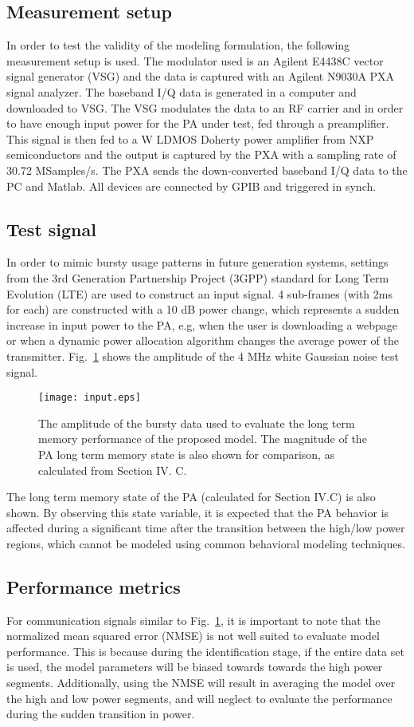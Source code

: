 \documentclass[journal]{IEEEtran}
\begin{document}
\subsection{Measurement setup}
In order to test the validity of the modeling formulation, the following measurement setup is used. The modulator used
is an Agilent E4438C vector signal generator (VSG) and the data is captured with an Agilent N9030A PXA signal analyzer. The baseband I/Q data is generated in a computer and
downloaded to VSG. The VSG modulates the data to an RF carrier and
in order to have enough input power for the PA under test, fed
through a preamplifier. This signal is then fed to a  W LDMOS Doherty power amplifier from NXP semiconductors and the output is captured by the PXA with a sampling rate of 30.72 MSamples/s. The
PXA sends the down-converted baseband I/Q data to the PC and Matlab. All devices are connected by
GPIB and triggered in synch.

\subsection{Test signal}
In order to mimic bursty usage patterns in future generation systems, settings from the 3rd Generation Partnership Project (3GPP) standard for Long Term Evolution (LTE) \cite{lte} are used to construct an input signal. 4 sub-frames (with 2ms for each) are constructed with a 10 dB power change, which represents a sudden increase in input power to the PA, e.g, when the user is downloading a webpage or when a dynamic power allocation algorithm changes the average power of the transmitter. Fig.~\ref{input} shows the amplitude of the 4 MHz white Gaussian noise test signal.
\begin{figure}
\centering
\texttt{[image: input.eps]}
\caption{The amplitude of the bursty data used to evaluate the long term memory performance of the proposed model. The magnitude of the PA long term memory state is also shown for comparison, as calculated from Section IV. C. } \label{input}
\end{figure}

The long term memory state of the PA (calculated for Section IV.C) is also shown. By observing this state variable, it is expected that the PA behavior is affected during a significant time after the transition between the high/low power regions, which cannot be modeled using common behavioral modeling techniques.

\subsection{Performance metrics}
For communication signals similar to Fig.~\ref{input}, it is important to note that the normalized mean squared error (NMSE) is not well suited to evaluate model performance. This is because during the identification stage, if the entire data set is used, the model parameters will be biased towards towards the high power segments. Additionally, using the NMSE will result in averaging the model over the high and low power segments, and will neglect to evaluate the performance during the sudden transition in power.
\end{document}
